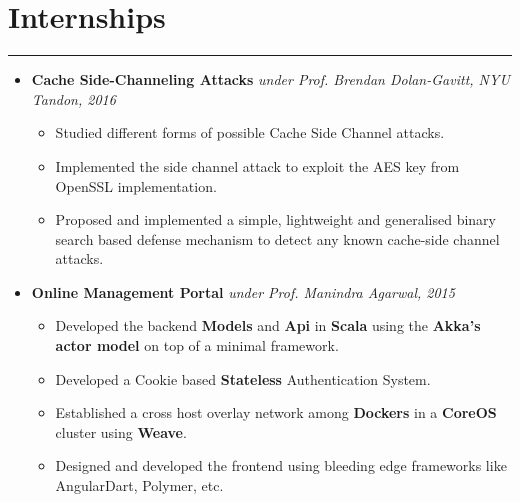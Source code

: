 \documentclass[a4paper]{article}
\begin{document}
\section*{Internships}
\hrule
\vspace{3mm}
  \begin{itemize}
  \item
    \textbf{Cache Side-Channeling Attacks}
         \hfill \textit{under Prof. Brendan Dolan-Gavitt, NYU Tandon, 2016}
      \begin{itemize}
      \setlength\itemsep{-0.2em}
          \item Studied different forms of possible Cache Side Channel attacks.
          \item Implemented the side channel attack to exploit the AES key from OpenSSL implementation.
          \item Proposed and implemented a simple, lightweight and generalised binary search based defense mechanism to detect any known cache-side channel attacks.
      \end{itemize}
  \item
   \textbf{Online Management Portal}
         \hfill \textit{under Prof. Manindra Agarwal, 2015}
  \begin{itemize}
      \setlength\itemsep{-0.2em}
      \item Developed the backend \textbf{Models} and \textbf{Api} in \textbf{Scala} using the \textbf{Akka's actor model} on top of a minimal framework.
       \item Developed a Cookie based \textbf{Stateless} Authentication System.
       \item Established a cross host overlay network among \textbf{Dockers} in a \textbf{CoreOS}
           cluster using \textbf{Weave}.
       \item Designed and developed the frontend using bleeding edge frameworks like AngularDart, Polymer, etc.
  \end{itemize}
  \end{itemize}
\end{document}
